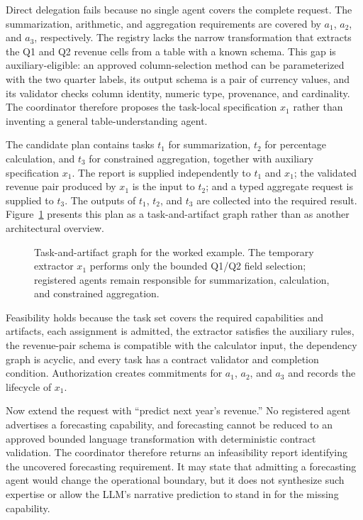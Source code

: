 Direct delegation fails because no single agent covers the complete request. The summarization, arithmetic, and aggregation requirements are covered by $a_1$, $a_2$, and $a_3$, respectively. The registry lacks the narrow transformation that extracts the Q1 and Q2 revenue cells from a table with a known schema. This gap is auxiliary-eligible: an approved column-selection method can be parameterized with the two quarter labels, its output schema is a pair of currency values, and its validator checks column identity, numeric type, provenance, and cardinality. The coordinator therefore proposes the task-local specification $x_1$ rather than inventing a general table-understanding agent.

The candidate plan contains tasks $t_1$ for summarization, $t_2$ for percentage calculation, and $t_3$ for constrained aggregation, together with auxiliary specification $x_1$. The report is supplied independently to $t_1$ and $x_1$; the validated revenue pair produced by $x_1$ is the input to $t_2$; and a typed aggregate request is supplied to $t_3$. The outputs of $t_1$, $t_2$, and $t_3$ are collected into the required result. Figure~\ref{fig:worked-example} presents this plan as a task-and-artifact graph rather than as another architectural overview.

\begin{figure}[htbp]
\centering
\resizebox{0.96\textwidth}{!}{}
\caption{Task-and-artifact graph for the worked example. The temporary extractor $x_1$ performs only the bounded Q1/Q2 field selection; registered agents remain responsible for summarization, calculation, and constrained aggregation.}
\label{fig:worked-example}
\end{figure}

Feasibility holds because the task set covers the required capabilities and artifacts, each assignment is admitted, the extractor satisfies the auxiliary rules, the revenue-pair schema is compatible with the calculator input, the dependency graph is acyclic, and every task has a contract validator and completion condition. Authorization creates commitments for $a_1$, $a_2$, and $a_3$ and records the lifecycle of $x_1$.

Now extend the request with ``predict next year's revenue.'' No registered agent advertises a forecasting capability, and forecasting cannot be reduced to an approved bounded language transformation with deterministic contract validation. The coordinator therefore returns an infeasibility report identifying the uncovered forecasting requirement. It may state that admitting a forecasting agent would change the operational boundary, but it does not synthesize such expertise or allow the LLM's narrative prediction to stand in for the missing capability.


